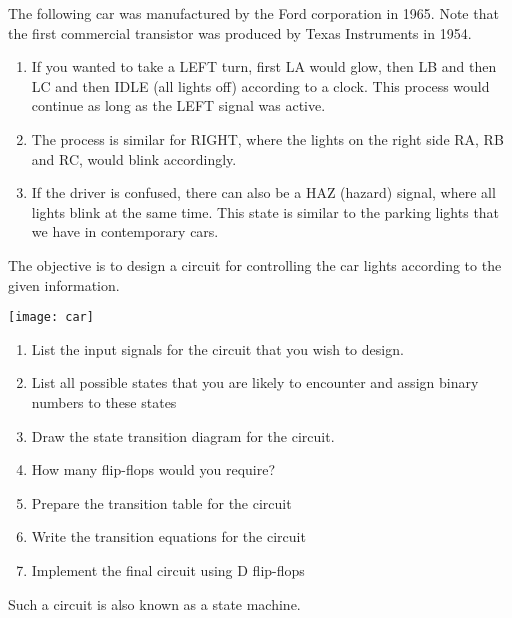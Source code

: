 \documentclass[12pt,onecolumn]{IEEEtran}
\theoremstyle{definition}
\theoremstyle{remark}
\begin{document}
\title{
}
\maketitle
\vspace{-1cm}

The following car was manufactured by the Ford corporation in 1965. Note that the first commercial transistor was produced by Texas Instruments in 1954.  
\begin{enumerate}
\item If you wanted to take a LEFT turn, first LA would glow, then LB and then LC and then IDLE (all lights off) according to a clock. This process would continue as long as the LEFT signal was active. 
\item  The process is similar for RIGHT, where the lights on the right side RA, RB and RC, would blink accordingly. 
\item  If the driver is confused, there can also be a HAZ (hazard) signal, where all lights blink at the same time.  This state is similar to the parking lights that we have in contemporary cars.
\end{enumerate}
The objective is to design a circuit for controlling the car lights according to the given information.
\begin{center}
\texttt{[image: car]}
\end{center}

\begin{enumerate}
\item List the input signals for the circuit that you wish to design.
\item List all possible states that you are likely to encounter and assign binary numbers to these states
\item Draw the state transition diagram for the circuit.
\item How many flip-flops would you require?
\item Prepare the transition table for the circuit
\item Write the transition equations for the circuit
\item Implement the final circuit using D flip-flops
\end{enumerate}
Such a circuit is also known as a state machine. 

%
\end{document}
